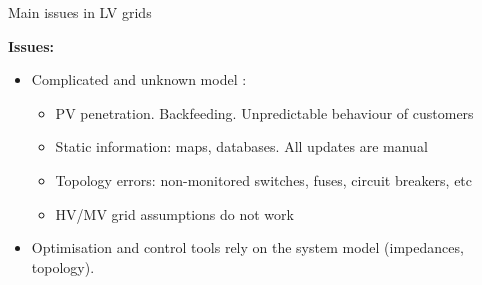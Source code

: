 \documentclass[../main.tex]{subfiles}
\begin{document}
\begin{frame}[t]{Main issues in LV grids}
{
\textbf{Issues:}
\begin{itemize}
\item<2-> Complicated and unknown model \cite{mokhtar2018automated}: 
\begin{itemize}
\item<2-> PV penetration. Backfeeding. Unpredictable behaviour of customers
\item<3-> Static information: maps, databases. All updates are manual
\item<4-> Topology errors: non-monitored switches, fuses, circuit breakers, etc
\item<5-> HV/MV grid assumptions do not work
\end{itemize}
\item<6-> Optimisation and control tools rely on the system model (impedances, topology).
\end{itemize}
}
\end{frame}


%
%
\end{document}
